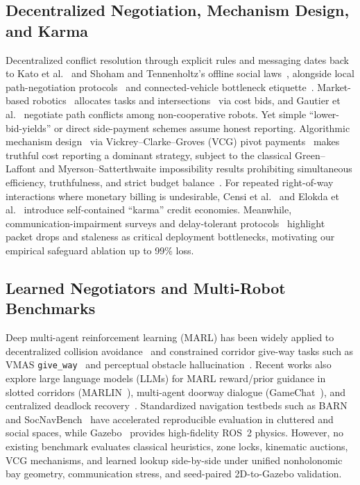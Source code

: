 \documentclass[letterpaper,journal]{IEEEtran}
\begin{document}
\subsection{Decentralized Negotiation, Mechanism Design, and Karma}
Decentralized conflict resolution through explicit rules and messaging dates back to Kato et al.~\cite{kato1992coordinating} and Shoham and Tennenholtz's offline social laws~\cite{shoham1995social}, alongside local path-negotiation protocols~\cite{purwin2008theory} and connected-vehicle bottleneck etiquette~\cite{bottleneckiv2023}. Market-based robotics~\cite{gerkey2002sold} allocates tasks and intersections~\cite{dresner2008multiagent} via cost bids, and Gautier et al.~\cite{gautier2022negotiated} negotiate path conflicts among non-cooperative robots. Yet simple ``lower-bid-yields'' or direct side-payment schemes assume honest reporting. Algorithmic mechanism design~\cite{nisan2001algorithmic} via Vickrey--Clarke--Groves (VCG) pivot payments~\cite{clarke1971multipart} makes truthful cost reporting a dominant strategy, subject to the classical Green--Laffont and Myerson--Satterthwaite impossibility results prohibiting simultaneous efficiency, truthfulness, and strict budget balance~\cite{green1977characterization}. For repeated right-of-way interactions where monetary billing is undesirable, Censi et al.~\cite{censi2019karma} and Elokda et al.~\cite{elokda2024karma} introduce self-contained ``karma'' credit economies. Meanwhile, communication-impairment surveys and delay-tolerant protocols~\cite{commfail2021,gielis2022critical} highlight packet drops and staleness as critical deployment bottlenecks, motivating our empirical safeguard ablation up to 99\% loss.

\subsection{Learned Negotiators and Multi-Robot Benchmarks}
Deep multi-agent reinforcement learning (MARL) has been widely applied to decentralized collision avoidance~\cite{chen2017cadrl,yu2022mappo} and constrained corridor give-way tasks such as VMAS \texttt{give\_way}~\cite{vmasgiveway,bettini2023heterogeneous} and perceptual obstacle hallucination~\cite{park2023hallucination}. Recent works also explore large language models (LLMs) for MARL reward/prior guidance in slotted corridors (MARLIN~\cite{marlin2024}), multi-agent doorway dialogue (GameChat~\cite{gamechat2025}), and centralized deadlock recovery~\cite{garg2024llm}. Standardized navigation testbeds such as BARN~\cite{xiao2022barn} and SocNavBench~\cite{francis2025principles} have accelerated reproducible evaluation in cluttered and social spaces, while Gazebo~\cite{gazebosim} provides high-fidelity ROS~2 physics. However, no existing benchmark evaluates classical heuristics, zone locks, kinematic auctions, VCG mechanisms, and learned lookup side-by-side under unified nonholonomic bay geometry, communication stress, and seed-paired 2D-to-Gazebo validation.
\end{document}
